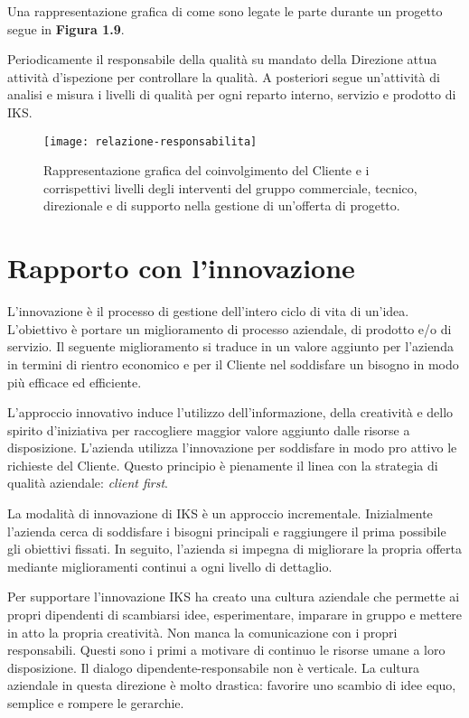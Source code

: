Una rappresentazione grafica di come sono legate le parte durante un progetto segue in \textbf{Figura 1.9}.

Periodicamente il responsabile della qualità su mandato della Direzione attua attività 
d'ispezione per controllare la qualità. A posteriori segue un'attività di analisi e 
misura i livelli di qualità per ogni reparto interno, servizio e prodotto di IKS.

\begin{figure}[htbp]
	\begin{center}
		\texttt{[image: relazione-responsabilita]}
		\caption{Rappresentazione grafica del coinvolgimento del Cliente e i corrispettivi livelli degli interventi 
			del gruppo commerciale, tecnico, direzionale e di supporto nella gestione di un'offerta di progetto.}
	\end{center}
\end{figure}



\section{Rapporto con l'innovazione}
L'innovazione è il processo di gestione dell'intero ciclo di vita di un'idea. 
L'obiettivo è portare un miglioramento di processo aziendale, di prodotto e/o 
di servizio. Il seguente miglioramento si traduce in un valore aggiunto per l'azienda 
in termini di rientro economico e per il Cliente nel soddisfare un bisogno in modo più
efficace ed efficiente. 

L'approccio innovativo induce l'utilizzo dell'informazione, della creatività e dello spirito 
d'iniziativa per raccogliere maggior valore aggiunto dalle risorse a disposizione. L'azienda 
utilizza l'innovazione per soddisfare in modo pro attivo le richieste del Cliente. Questo principio
è pienamente il linea con la strategia di qualità aziendale: \textit{client first}.

La modalità di innovazione di IKS è un approccio incrementale. Inizialmente l'azienda cerca di 
soddisfare i bisogni principali e raggiungere il prima possibile gli obiettivi fissati. In seguito, 
l'azienda si impegna di migliorare la propria offerta mediante miglioramenti continui a ogni 
livello di dettaglio. 

Per supportare l'innovazione IKS ha creato una cultura aziendale che permette ai propri dipendenti
di scambiarsi idee, esperimentare, imparare in gruppo e mettere in atto la propria creatività.
Non manca la comunicazione con i propri responsabili. Questi sono i primi a motivare di continuo 
le risorse umane a loro disposizione. Il dialogo dipendente-responsabile non è verticale. La cultura 
aziendale in questa direzione è molto drastica: favorire uno scambio di idee equo, semplice e rompere 
le gerarchie. 

